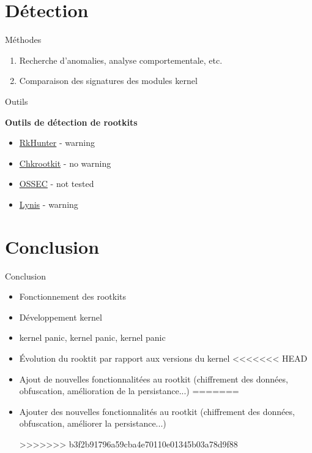 \documentclass[10pt]{beamer}
\begin{document}
\section{Détection}

\begin{frame}{Méthodes}
	
	\begin{alertblock}{}
		\begin{enumerate}
			\item Recherche d'anomalies, analyse comportementale, etc.
			\item Comparaison des signatures des modules kernel
		\end{enumerate}
    \end{alertblock}
	

\end{frame}

\begin{frame}{Outils}
	
	\textbf{Outils de détection de rootkits}
	\begin{itemize}
		\item \href{http://rkhunter.sourceforge.net/}{RkHunter} - \alert{warning}
		\item \href{http://www.chkrootkit.org/}{Chkrootkit} - {\color[rgb]{0,0.8,0.3} no warning}
		\item \href{http://ossec.github.io/}{OSSEC}   - {\color{gray} not tested}
		\item \href{https://cisofy.com/lynis/}{Lynis} - \alert{warning}
	\end{itemize}
	
\end{frame}


\section*{Conclusion}

\begin{frame}{Conclusion}
	
	\begin{alertblock}{}
	\begin{itemize}
		\item Fonctionnement des rootkits
		\item Développement kernel
		\item kernel panic, kernel panic, kernel panic
		\item Évolution du rooktit par rapport aux versions du kernel
<<<<<<< HEAD
		\item Ajout de nouvelles fonctionnalitées au rootkit (chiffrement des données, obfuscation, amélioration de la persistance...)
=======
		\item Ajouter des nouvelles fonctionnalités au rootkit (chiffrement des données, obfuscation, améliorer la persistance...)
		
>>>>>>> b3f2b91796a59cba4e70110e01345b03a78d9f88
	\end{itemize}
    \end{alertblock}

\end{frame}
\end{document}
